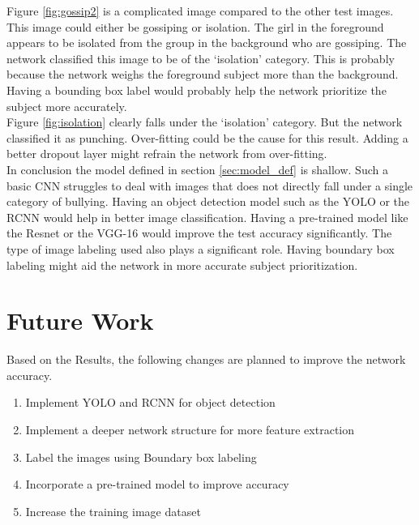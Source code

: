 \documentclass[12pt]{article}
\begin{document}
Figure \ref{fig:gossip2} is a complicated image compared to the other test images. This image could either be gossiping or isolation. The girl in the foreground appears to be isolated from the group in the background who are gossiping. The network classified this image to be of the \lq{isolation}\rq{} category. This is probably because the network weighs the foreground subject more than the background. Having a bounding box label would probably help the network prioritize the subject more accurately. \\

Figure \ref{fig:isolation} clearly falls under the \lq{isolation}\rq{} category. But the network classified it as punching. Over-fitting could be the cause for this result. Adding a better dropout layer might refrain the network from over-fitting. \\

In conclusion the model defined in section \ref{sec:model_def} is shallow. Such a basic CNN struggles to deal with images that does not directly fall under a single category of bullying. Having an object detection model such as the YOLO or the RCNN would help in better image classification. Having a pre-trained model like the Resnet or the VGG-16 would improve the test accuracy significantly. The type of image labeling used also plays a significant role. Having boundary box labeling might aid the network in more accurate subject prioritization.   


\section{Future Work}
Based on the Results, the following changes are planned to improve the network accuracy. 
\begin{enumerate}
	\item Implement YOLO and RCNN for object detection
	\item Implement a deeper network structure for more feature extraction
	\item Label the images using Boundary box labeling
	\item Incorporate a pre-trained model to improve accuracy
	\item Increase the training image dataset
\end{enumerate}


 
 
\newpage
\end{document}
